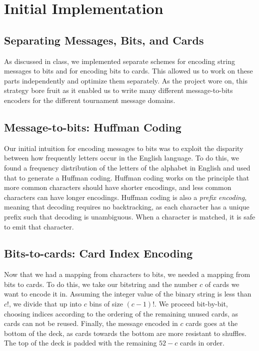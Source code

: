 \documentclass[titlepage]{article}
\begin{document}
\section{Initial Implementation}

\subsection{Separating Messages, Bits, and Cards}
As discussed in class, we implemented separate schemes for encoding string messages to bits and for encoding bits to cards. This allowed us to work on these parts independently and optimize them separately. As the project wore on, this strategy bore fruit as it enabled us to write many different message-to-bits encoders for the different tournament message domains.


\subsection{Message-to-bits: Huffman Coding}
Our initial intuition for encoding messages to bits was to exploit the disparity between how frequently letters occur in the English language. To do this, we found a frequency distribution of the letters of the alphabet in English and used that to generate a Huffman coding. Huffman coding works on the principle that more common characters should have shorter encodings, and less common characters can have longer encodings. Huffman coding is also a \textit{prefix encoding}, meaning that decoding requires no backtracking, as each character has a unique prefix such that decoding is unambiguous. When a character is matched, it is safe to emit that character.

\subsection{Bits-to-cards: Card Index Encoding}
Now that we had a mapping from characters to bits, we needed a mapping from bits to cards. To do this, we take our bitstring and the number $c$ of cards we want to encode it in. Assuming the integer value of the binary string is less than $c!$, we divide that up into $c$ bins of size $(c-1)!$. We proceed bit-by-bit, choosing indices according to the ordering of the remaining unused cards, as cards can not be reused. Finally, the message encoded in $c$ cards goes at the bottom of the deck, as cards towards the bottom are more resistant to shuffles. The top of the deck is padded with the remaining $52-c$ cards in order.
\end{document}
